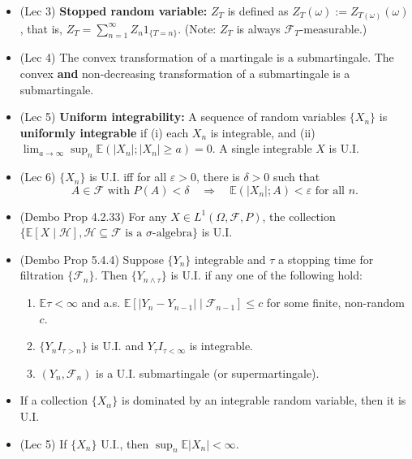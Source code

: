 \documentclass[twoside]{article}
\newcommand{\dis}{\displaystyle}
\newcommand\bbE{\mathbb{E}}
\newcommand\calF{\mathcal{F}}
\newcommand\calH{\mathcal{H}}
\newcommand\dlt{\delta}
\def\eps{\varepsilon}
\newcommand\om{\omega}
\newcommand\Om{\Omega}
\newcommand\sg{\sigma}
\begin{document}
\begin{itemize}
\item (Lec 3) \textbf{Stopped random variable:} $Z_T$ is defined as $Z_T (\om) := Z_{T(\om)} (\om)$,
that is, $Z_T = \dis\sum_{n=1}^\infty Z_n 1_{\{T = n\}}$. (Note: $Z_T$ is always $\calF_T$-measurable.)

\item (Lec 4) The convex transformation of a martingale is a submartingale. The convex \textbf{and} non-decreasing transformation of a submartingale is a submartingale.

\item (Lec 5) \textbf{Uniform integrability:} A sequence of random variables $\{ X_n \}$ is \textbf{uniformly integrable} if (i) each $X_n$ is integrable, and (ii) $\dis\lim_{a \rightarrow \infty} \sup_n \bbE (|X_n|; |X_n| \geq a) = 0$. A single integrable $X$ is U.I.

\item (Lec 6) $\{ X_n \}$ is U.I. iff for all $\eps > 0$, there is $\dlt > 0$ such that 
\begin{equation*} A \in \calF \text{ with } P(A) < \dlt \quad \Rightarrow \quad \bbE (|X_n|; A) < \eps \text{ for all } n. \end{equation*}

\item (Dembo Prop 4.2.33) For any $X \in L^1(\Om, \calF, P)$, the collection $\{ \bbE [X \mid \calH], \calH \subseteq \calF \text{ is a $\sg$-algebra} \}$ is U.I.

\item (Dembo Prop 5.4.4) Suppose $\{ Y_n\}$ integrable and $\tau$ a stopping time for filtration $\{\calF_n\}$. Then  $\{ Y_{n \wedge \tau}\}$ is U.I. if any one of the following hold:
\begin{enumerate}
\item $\bbE \tau < \infty$ and a.s. $\bbE [|Y_n - Y_{n-1}| \mid \calF_{n-1}] \leq c$ for some finite, non-random $c$.
\item $\{Y_n I_{\tau > n} \}$ is U.I. and $Y_\tau I_{\tau < \infty}$ is integrable.
\item $(Y_n, \calF_n)$ is a U.I. submartingale (or supermartingale).
\end{enumerate}

\item If a collection $\{ X_\alpha\}$ is dominated by an integrable random variable, then it is U.I.

\item (Lec 5) If $\{ X_n \}$ U.I., then $\dis\sup_n \bbE |X_n| < \infty$.


\end{itemize}
\end{document}
